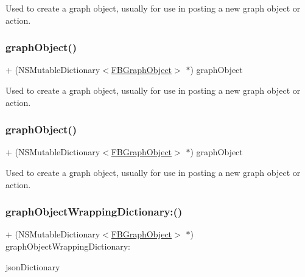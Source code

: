 Used to create a graph object, usually for use in posting a new graph object or action. \mbox{\label{interfaceFBGraphObject_af260be1d9411288632bf883f84838853}} 
\subsubsection{\texorpdfstring{graph\+Object()}{graphObject()}\hspace{0.1cm}{\footnotesize\ttfamily [4/5]}}
{\footnotesize\ttfamily + (N\+S\+Mutable\+Dictionary$<$\hyperlink{interfaceFBGraphObject}{F\+B\+Graph\+Object}$>$ $\ast$) graph\+Object \begin{DoxyParamCaption}{ }\end{DoxyParamCaption}}

Used to create a graph object, usually for use in posting a new graph object or action. \mbox{\label{interfaceFBGraphObject_af260be1d9411288632bf883f84838853}} 
\subsubsection{\texorpdfstring{graph\+Object()}{graphObject()}\hspace{0.1cm}{\footnotesize\ttfamily [5/5]}}
{\footnotesize\ttfamily + (N\+S\+Mutable\+Dictionary$<$\hyperlink{interfaceFBGraphObject}{F\+B\+Graph\+Object}$>$ $\ast$) graph\+Object \begin{DoxyParamCaption}{ }\end{DoxyParamCaption}}

Used to create a graph object, usually for use in posting a new graph object or action. \mbox{\label{interfaceFBGraphObject_af840ca586bf7b7ecf55d97c0e780f2cd}} 
\subsubsection{\texorpdfstring{graph\+Object\+Wrapping\+Dictionary\+:()}{graphObjectWrappingDictionary:()}\hspace{0.1cm}{\footnotesize\ttfamily [1/5]}}
{\footnotesize\ttfamily + (N\+S\+Mutable\+Dictionary$<$\hyperlink{interfaceFBGraphObject}{F\+B\+Graph\+Object}$>$ $\ast$) graph\+Object\+Wrapping\+Dictionary\+: \begin{DoxyParamCaption}\item[{(N\+S\+Dictionary $\ast$)}]{json\+Dictionary }\end{DoxyParamCaption}}

